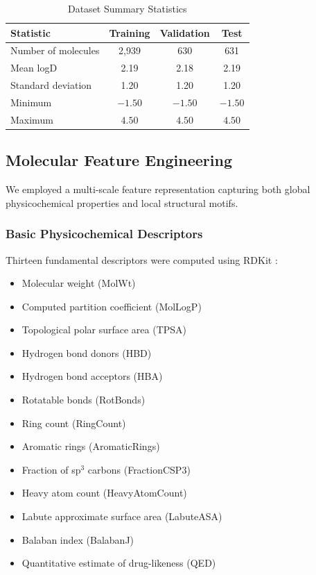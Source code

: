 \documentclass[12pt,a4paper]{article}
\begin{document}
\begin{table}[H]
\centering
\caption{Dataset Summary Statistics}
\begin{tabular}{lccc}
\toprule
Statistic & Training & Validation & Test \\
\midrule
Number of molecules & 2,939 & 630 & 631 \\
Mean logD & 2.19 & 2.18 & 2.19 \\
Standard deviation & 1.20 & 1.20 & 1.20 \\
Minimum & $-1.50$ & $-1.50$ & $-1.50$ \\
Maximum & $4.50$ & $4.50$ & $4.50$ \\
\bottomrule
\end{tabular}
\label{tab:dataset_stats}
\end{table}

\subsection{Molecular Feature Engineering}

We employed a multi-scale feature representation capturing both global physicochemical properties and local structural motifs.

\subsubsection{Basic Physicochemical Descriptors}
Thirteen fundamental descriptors were computed using RDKit \citep{landrum2016rdkit}:

\begin{itemize}
    \item Molecular weight (MolWt)
    \item Computed partition coefficient (MolLogP)
    \item Topological polar surface area (TPSA)
    \item Hydrogen bond donors (HBD)
    \item Hydrogen bond acceptors (HBA)
    \item Rotatable bonds (RotBonds)
    \item Ring count (RingCount)
    \item Aromatic rings (AromaticRings)
    \item Fraction of sp$^3$ carbons (FractionCSP3)
    \item Heavy atom count (HeavyAtomCount)
    \item Labute approximate surface area (LabuteASA)
    \item Balaban index (BalabanJ)
    \item Quantitative estimate of drug-likeness (QED)
\end{itemize}
\end{document}
